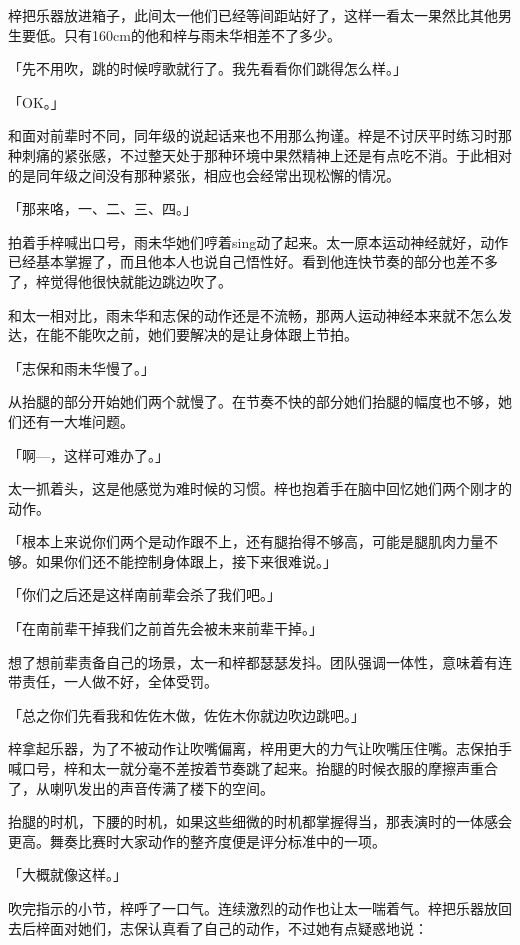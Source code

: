 \documentclass[UTF8]{ctexart}
\begin{document}
    梓把乐器放进箱子，此间太一他们已经等间距站好了，这样一看太一果然比其他男生要低。只有160cm的他和梓与雨未华相差不了多少。

    「先不用吹，跳的时候哼歌就行了。我先看看你们跳得怎么样。」

    「OK。」

    和面对前辈时不同，同年级的说起话来也不用那么拘谨。梓是不讨厌平时练习时那种刺痛的紧张感，不过整天处于那种环境中果然精神上还是有点吃不消。于此相对的是同年级之间没有那种紧张，相应也会经常出现松懈的情况。

    「那来咯，一、二、三、四。」

    拍着手梓喊出口号，雨未华她们哼着sing动了起来。太一原本运动神经就好，动作已经基本掌握了，而且他本人也说自己悟性好。看到他连快节奏的部分也差不多了，梓觉得他很快就能边跳边吹了。

    和太一相对比，雨未华和志保的动作还是不流畅，那两人运动神经本来就不怎么发达，在能不能吹之前，她们要解决的是让身体跟上节拍。

    「志保和雨未华慢了。」

    从抬腿的部分开始她们两个就慢了。在节奏不快的部分她们抬腿的幅度也不够，她们还有一大堆问题。

    「啊—，这样可难办了。」

    太一抓着头，这是他感觉为难时候的习惯。梓也抱着手在脑中回忆她们两个刚才的动作。

    「根本上来说你们两个是动作跟不上，还有腿抬得不够高，可能是腿肌肉力量不够。如果你们还不能控制身体跟上，接下来很难说。」

    「你们之后还是这样南前辈会杀了我们吧。」

    「在南前辈干掉我们之前首先会被未来前辈干掉。」

    想了想前辈责备自己的场景，太一和梓都瑟瑟发抖。团队强调一体性，意味着有连带责任，一人做不好，全体受罚。

    「总之你们先看我和佐佐木做，佐佐木你就边吹边跳吧。」

    梓拿起乐器，为了不被动作让吹嘴偏离，梓用更大的力气让吹嘴压住嘴。志保拍手喊口号，梓和太一就分毫不差按着节奏跳了起来。抬腿的时候衣服的摩擦声重合了，从喇叭发出的声音传满了楼下的空间。

    抬腿的时机，下腰的时机，如果这些细微的时机都掌握得当，那表演时的一体感会更高。舞奏比赛时大家动作的整齐度便是评分标准中的一项。

    「大概就像这样。」

    吹完指示的小节，梓呼了一口气。连续激烈的动作也让太一喘着气。梓把乐器放回去后梓面对她们，志保认真看了自己的动作，不过她有点疑惑地说：
\end{document}
